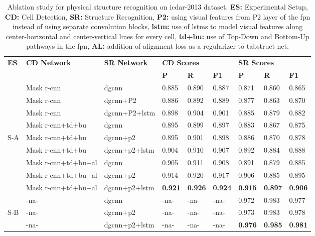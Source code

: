 \documentclass[runningheads]{llncs}
\begin{document}
\begin{table}[ht!]
\addtolength{\tabcolsep}{-1.0pt}
\begin{center}
\begin{tabular}{|l|l |l |l l l| l l l|} \hline
\textbf{ES} &\textbf{CD Network} & \textbf{SR Network} &\multicolumn{3}{l|}{\textbf{CD Scores}} &\multicolumn{3}{l|}{\textbf{SR Scores}} \\ \cline{4-9}
 &  &   &\textbf{P} &\textbf{R} &\textbf{F1} &\textbf{P} &\textbf{R} &\textbf{F1} \\ \hline
&Mask {\sc r-cnn} &{\sc dgcnn} &0.885 &0.890	&0.887 &0.871 &0.860 &0.865 \\
&Mask {\sc r-cnn} &{\sc dgcnn}+P2 &0.886	&0.892 &0.889 &0.877 &0.863	&0.870 \\
&Mask {\sc r-cnn} &{\sc dgcnn}+P2+{\sc lstm} &0.898	&0.904 &0.901 &0.885 &0.879 &0.882 \\ \cline{2-9}
&Mask {\sc r-cnn}+{\sc td}+{\sc bu} &{\sc dgcnn} &0.895 &0.899 &0.897 &0.883	&0.867 &0.875 \\
S-A &Mask {\sc r-cnn}+{\sc td}+{\sc bu} &{\sc dgcnn}+{\sc p}2 &0.895 &0.901 &0.898 &0.886 &0.870 &0.878 \\ 
&Mask {\sc r-cnn}+{\sc td}+{\sc bu}	&{\sc dgcnn}+{\sc p}2+{\sc lstm} &0.904 &0.910 &0.907	&0.892 &0.884 &0.888 \\ \cline{2-9}
&Mask {\sc r-cnn}+{\sc td}+{\sc bu}+{\sc al} &{\sc dgcnn} &0.905	&0.911 &0.908 &0.891 &0.879&	0.885 \\	
&Mask {\sc r-cnn}+{\sc td}+{\sc bu}+{\sc al} &{\sc dgcnn}+{\sc p}2 &0.914 &0.920 &0.917 &0.906	&0.885 &0.895 \\
&Mask {\sc r-cnn}+{\sc td}+{\sc bu}+{\sc al} &{\sc dgcnn}+{\sc p}2+{\sc lstm} &\textbf{0.921} &\textbf{0.926} &\textbf{0.924} &\textbf{0.915} &\textbf{0.897} &\textbf{0.906} \\ \hline
 & -{\sc na}- &{\sc dgcnn} & -{\sc na}- & -{\sc na}-  & -{\sc na}- &0.972 &0.983	&0.977 \\ 
S-B & -{\sc na}- &{\sc dgcnn}+{\sc p}2  & -{\sc na}- & -{\sc na}- & -{\sc na}- &0.973 &0.983	&0.978 \\
  & -{\sc na}-  &{\sc dgcnn}+{\sc p}2+{\sc lstm} & -{\sc na}- & -{\sc na}- & -{\sc na}- &\textbf{0.976}	&\textbf{0.985} &\textbf{0.981} \\ \hline 
\end{tabular}
\end{center}
\caption{Ablation study for physical structure recognition on {\sc icdar}-2013 dataset. \textbf{ES:} Experimental Setup, \textbf{CD:} Cell Detection, \textbf{SR:} Structure Recognition, \textbf{P2:} using visual features from P2 layer of the {\sc fpn} instead of using separate convolution blocks, \textbf{{\sc lstm}:} use of {\sc lstm}s to model visual features along center-horizontal and center-vertical lines for every cell, \textbf{{\sc td}+{\sc bu}:} use of Top-Down and Bottom-Up pathways in the {\sc fpn}, \textbf{AL:} addition of alignment loss as a regularizer to {\sc t}ab{\sc s}truct-{\sc n}et. \label{table_ablation_study_physical_icdar_2013}}
\vspace{-1em}
\end{table}
\end{document}
